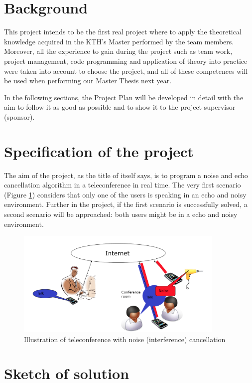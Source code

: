 \documentclass[11pt]{article}
\begin{document}
\section{Background}

This project intends to be the first real project where to apply the theoretical knowledge acquired in the KTH's Master performed by the team members. Moreover, all the experience to gain during the project such as team work, project management, code programming and application of theory into practice were taken into account to choose the project, and all of these competences will be used when performing our Master Thesis next year.

In the following sections, the Project Plan will be developed in detail with the aim to follow it as good as possible and to show it to the project supervisor (sponsor).


\section{Specification of the project}

The aim of the project, as the title of itself says, is to program a noise and echo cancellation algorithm in a teleconference in real time. The very first scenario (Figure \ref{scenario}) considers that only one of the users is speaking in an echo and noisy environment. Further in the project, if the first scenario is successfully solved, a second scenario will be approached: both users might be in a echo and noisy environment.

		\begin{figure}[h]
		\centering
		\includegraphics[width=10cm]{scenario}
		\caption{Illustration of teleconference with noise (interference) cancellation}
		\label{scenario}
		\end{figure}

\section{Sketch of solution}
\end{document}
